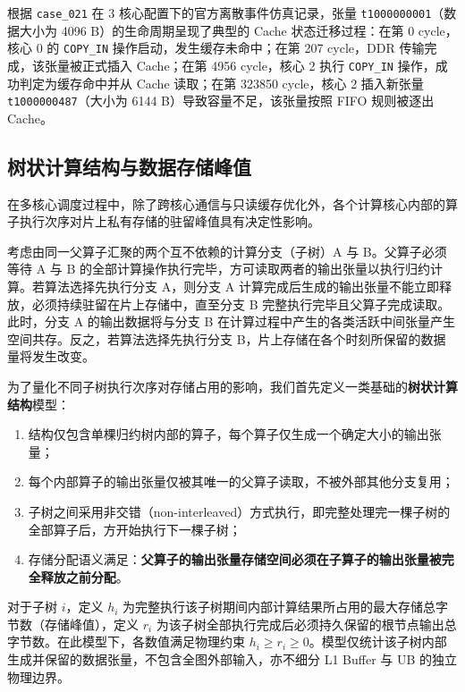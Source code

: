 \documentclass[anonymous,notoc]{gmcm2026}
\providecommand{\tightlist}{\setlength{\itemsep}{0pt}\setlength{\parskip}{0pt}}
\begin{document}
根据 \texttt{case\_021} 在 3 核心配置下的官方离散事件仿真记录，张量 \texttt{t1000000001}（数据大小为 4096 B）的生命周期呈现了典型的 Cache 状态迁移过程：在第 0 cycle，核心 0 的 \texttt{COPY\_IN} 操作启动，发生缓存未命中；在第 207 cycle，DDR 传输完成，该张量被正式插入 Cache；在第 4956 cycle，核心 2 执行 \texttt{COPY\_IN} 操作，成功判定为缓存命中并从 Cache 读取；在第 323850 cycle，核心 2 插入新张量 \texttt{t1000000487}（大小为 6144 B）导致容量不足，该张量按照 FIFO 规则被逐出 Cache。

\subsection{树状计算结构与数据存储峰值}

在多核心调度过程中，除了跨核心通信与只读缓存优化外，各个计算核心内部的算子执行次序对片上私有存储的驻留峰值具有决定性影响。

考虑由同一父算子汇聚的两个互不依赖的计算分支（子树）A 与 B。父算子必须等待 A 与 B 的全部计算操作执行完毕，方可读取两者的输出张量以执行归约计算。若算法选择先执行分支 A，则分支 A 计算完成后生成的输出张量不能立即释放，必须持续驻留在片上存储中，直至分支 B 完整执行完毕且父算子完成读取。此时，分支 A 的输出数据将与分支 B 在计算过程中产生的各类活跃中间张量产生空间共存。反之，若算法选择先执行分支 B，片上存储在各个时刻所保留的数据量将发生改变。

为了量化不同子树执行次序对存储占用的影响，我们首先定义一类基础的\textbf{树状计算结构}模型：

\begin{enumerate}
\def\labelenumi{\arabic{enumi}.}
\tightlist
\item
  结构仅包含单棵归约树内部的算子，每个算子仅生成一个确定大小的输出张量；
\item
  每个内部算子的输出张量仅被其唯一的父算子读取，不被外部其他分支复用；
\item
  子树之间采用非交错（non-interleaved）方式执行，即完整处理完一棵子树的全部算子后，方开始执行下一棵子树；
\item
  存储分配语义满足：\textbf{父算子的输出张量存储空间必须在子算子的输出张量被完全释放之前分配}。
\end{enumerate}

对于子树 \(i\)，定义 \(h_i\) 为完整执行该子树期间内部计算结果所占用的最大存储总字节数（存储峰值），定义 \(r_i\) 为该子树全部执行完成后必须持久保留的根节点输出总字节数。在此模型下，各数值满足物理约束 \(h_i \ge r_i \ge 0\)。模型仅统计该子树内部生成并保留的数据张量，不包含全图外部输入，亦不细分 L1 Buffer 与 UB 的独立物理边界。
\end{document}
